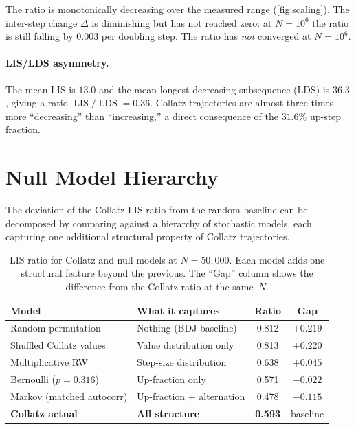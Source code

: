 \documentclass[11pt]{article}
\theoremstyle{definition}
\theoremstyle{remark}
\newcommand{\LIS}{\operatorname{LIS}}
\newcommand{\LDS}{\operatorname{LDS}}
\begin{document}
The ratio is monotonically decreasing over the measured range
(\cref{fig:scaling}). The inter-step change $\Delta$ is diminishing but
has not reached zero: at $N = 10^6$ the ratio is still falling by $0.003$
per doubling step. The ratio has \emph{not} converged at $N = 10^6$.

\paragraph{LIS/LDS asymmetry.}
The mean LIS is $13.0$ and the mean longest decreasing subsequence (LDS) is
$36.3$, giving a ratio $\LIS/\LDS = 0.36$. Collatz trajectories are almost
three times more ``decreasing'' than ``increasing,'' a direct consequence of
the $31.6\%$ up-step fraction.

\section{Null Model Hierarchy}\label{sec:null}

The deviation of the Collatz LIS ratio from the random baseline can be
decomposed by comparing against a hierarchy of stochastic models, each
capturing one additional structural property of Collatz trajectories.

\begin{table}[ht]
\centering
\caption{LIS ratio for Collatz and null models at $N = 50{,}000$. Each
model adds one structural feature beyond the previous. The ``Gap'' column
shows the difference from the Collatz ratio at the same~$N$.}
\label{tab:null}
\begin{tabular}{@{}llcc@{}}
\toprule
Model & What it captures & Ratio & Gap \\
\midrule
Random permutation       & Nothing (BDJ baseline)    & 0.812 & $+0.219$ \\
Shuffled Collatz values  & Value distribution only    & 0.813 & $+0.220$ \\
Multiplicative RW        & Step-size distribution     & 0.638 & $+0.045$ \\
Bernoulli ($p = 0.316$)  & Up-fraction only           & 0.571 & $-0.022$ \\
Markov (matched autocorr)& Up-fraction + alternation  & 0.478 & $-0.115$ \\
\midrule
\textbf{Collatz actual}  & \textbf{All structure}     & \textbf{0.593} & baseline \\
\bottomrule
\end{tabular}
\end{table}
\end{document}
